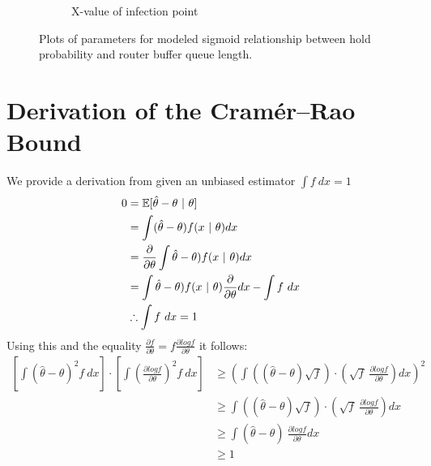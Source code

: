 \begin{figure}[H]
\begin{subfigure}{0.475\textwidth}
            \caption{X-value of infection point}
        \end{subfigure}
        \caption{Plots of parameters for modeled sigmoid relationship between hold probability and router buffer queue length.}
        \label{fig:Rsigmoidcoefs}
    \end{figure}
    
\section{Derivation of the Cramér–Rao Bound}
We provide a derivation from \cite{trees_detection_2013} given an unbiased estimator $\int f\ dx=1$ 
\begin{align*}
    0 &= \EX[\hat\theta - \theta\ |\ \theta]\\
    &= \int (\hat\theta - \theta) f(x\ |\ \theta)dx\\
    &= \frac{\partial}{\partial\theta}\int \hat\theta - \theta) f(x\ |\ \theta)dx\\
    &= \int \hat\theta - \theta) f(x\ |\ \theta)\frac{\partial}{\partial\theta}dx-\int f\ dx\\
    &\therefore \int f\ dx = 1
\end{align*}
Using this and the equality $\frac{\partial f}{\partial\theta} = f\frac{\partial log f}{\partial\theta}$ it follows:
\begin{equation}\label{eq:crbderivation}
\begin{aligned}
    \left[\int(\hat\theta -\theta)^2 f\ dx\right]\cdot
    \left[\int\left(\frac{\partial logf}{\partial\theta}\right)^2 f\ dx\right] &\geq
    \left(\int((\hat\theta-\theta)\sqrt{f})\cdot
    \left(\sqrt{f}\ \frac{\partial logf}{\partial\theta}\right) dx\right)^2\\
    & \geq \int((\hat\theta-\theta)\sqrt{f})\cdot\left(\sqrt{f}\ \frac{\partial logf}{\partial\theta}\right) dx\\
    & \geq \int(\hat\theta-\theta)\ \frac{\partial logf}{\partial\theta}dx\\
    & \geq 1
\end{aligned}
\end{equation}